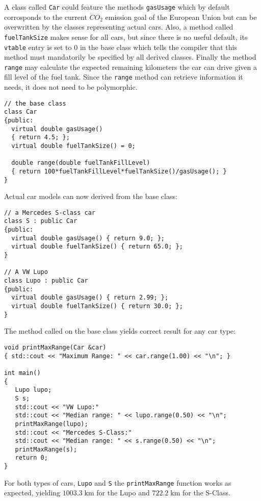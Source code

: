 \begin{example}
  A class called \texttt{Car} could feature the methods
  \texttt{gasUsage} which by default corrosponds to the current $CO_2$
  emission goal of the European Union but can be overwritten by the
  classes representing actual cars. Also, a method called
  \texttt{fuelTankSize} makes sense for all cars, but since there is
  no useful default, its \texttt{vtable} entry is set to $0$ in the
  base class which tells the compiler that this method must
  mandatorily be specified by all derived classes. Finally the method
  \texttt{range} may calculate the expected remaining kilometers the
  car can drive given a fill level of the fuel tank. Since the
  \texttt{range} method can retrieve information it needs, it does not
  need to be polymorphic.
\begin{verbatim}
// the base class
class Car
{public:
  virtual double gasUsage() 
  { return 4.5; };
  virtual double fuelTankSize() = 0;
  
  double range(double fuelTankFillLevel) 
  { return 100*fuelTankFillLevel*fuelTankSize()/gasUsage(); }
}
\end{verbatim}

  Actual car models can now derived from the base class:
\begin{verbatim}
// a Mercedes S-class car
class S : public Car
{public:
  virtual double gasUsage() { return 9.0; };
  virtual double fuelTankSize() { return 65.0; };
}

// A VW Lupo
class Lupo : public Car
{public:
  virtual double gasUsage() { return 2.99; };
  virtual double fuelTankSize() { return 30.0; };
}
\end{verbatim}

The  method called on the base class yields correct result
for any car type:
\begin{verbatim}
void printMaxRange(Car &car)
{ std::cout << "Maximum Range: " << car.range(1.00) << "\n"; }

int main()
{
   Lupo lupo;
   S s;
   std::cout << "VW Lupo:"
   std::cout << "Median range: " << lupo.range(0.50) << "\n";
   printMaxRange(lupo);
   std::cout << "Mercedes S-Class:"
   std::cout << "Median range: " << s.range(0.50) << "\n";
   printMaxRange(s);
   return 0;
}
\end{verbatim}

For both types of cars, \texttt{Lupo} and \texttt{S} the
\texttt{printMaxRange} function works as expected, yielding
$1003.3\;\mathrm{km}$ for the Lupo and $722.2\;\mathrm{km}$ for the
S-Class.
\end{example}

